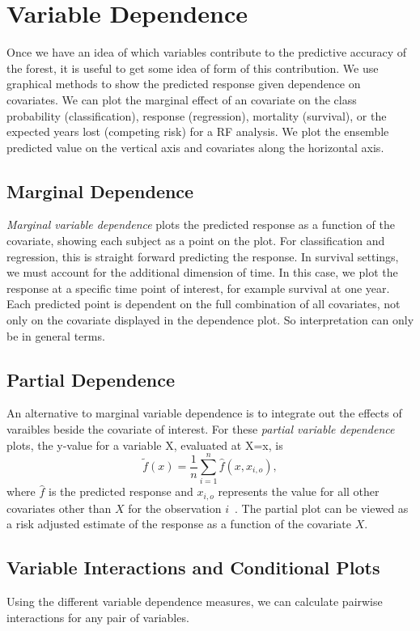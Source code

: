 \documentclass[nojss]{jss}\usepackage[]{graphicx}\usepackage[]{color}
\begin{document}
\section{Variable Dependence}
Once we have an idea of which variables contribute to the predictive accuracy of the forest, it is useful to get some idea of form of this contribution. We use graphical methods to show the predicted response given dependence on covariates. We can plot the marginal effect of an covariate on the class probability (classification), response (regression), mortality (survival), or the expected years lost (competing risk) for a RF analysis. We plot the ensemble predicted value on the vertical axis and covariates along the horizontal axis.

\subsection{Marginal Dependence}\label{S:variablePlots}
\emph{Marginal variable dependence} plots the predicted response as a function of the covariate, showing each subject as a point on the plot. For classification and regression, this is straight forward predicting the response. In survival settings, we must account for the additional dimension of time. In this case, we plot the response at a specific time point of interest, for example survival at one year. Each predicted point is dependent on the full combination of all covariates, not only on the covariate displayed in the dependence plot. So interpretation can only be in general terms.  


\subsection{Partial Dependence}\label{S:variablePlots}

An alternative to marginal variable dependence is to integrate out the effects of varaibles beside the covariate of interest. For these \emph{partial variable dependence} plots, the y-value for a variable X, evaluated at X=x, is
\[
\tilde{f}(x) = \frac{1}{n} \sum_{i=1}^n \hat{f}(x, x_{i,o}),
\]
where $\hat{f}$ is the predicted response and $x_{i,o}$ represents the value for all other covariates other than $X$ for the observation $i$~\citep{FriedmanGreedyfunction:2000}. The partial plot can be viewed as a risk adjusted estimate of the response as a function of the covariate $X$.



\subsection{Variable Interactions and Conditional Plots}
Using the different variable dependence measures, we can calculate pairwise interactions for any pair of variables. 
\end{document}
